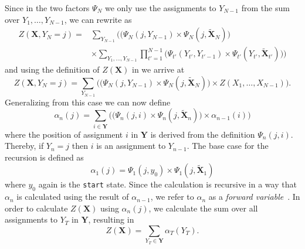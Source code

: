 Since in the two \glspl{factor} $\Psi_N$ we only use the assignments to $Y_{N-1}$ from the sum over $Y_1,\dots,Y_{N-1}$, we can rewrite  as
\begin{equation}
  \label{equ:linear-chain-crf-z-j-2}
  \begin{split}
    Z(\bm{X},Y_N=j) = & \sum_{Y_{N-1}}\bigg(\Big(\Psi_N(j,Y_{N-1})\times\Psi_N(j,\bm{\tilde{X}}_N)\Big) \\
    & \times\sum_{Y_1,\dots,Y_{N-1}}\prod_{t'=1}^{N-1}\Big(\Psi_{t'}(Y_{t'},Y_{t'-1})\times\Psi_{t'}(Y_{t'},\bm{\tilde{X}}_{t'})\Big)\bigg)
  \end{split}
\end{equation}
and using the definition of $Z(\bm{X})$ in  we arrive at
\begin{equation}
  \label{equ:linear-chain-crf-z-j-3}
  Z(\bm{X},Y_N=j) = \sum_{Y_{N-1}}\bigg(\Big(\Psi_N(j,Y_{N-1})\times\Psi_N(j,\bm{\tilde{X}}_N)\Big)\times Z(X_1,\dots,X_{N-1})\bigg).
  \end{equation}
Generalizing from this case we can now define
\begin{equation}
  \label{equ:linear-chain-crf-z-alpha}
  \alpha_n(j) = \sum_{i\in\bm{Y}}\bigg(\Big(\Psi_n(j,i)\times\Psi_n(j,\bm{\tilde{X}}_n)\Big)\times \alpha_{n-1}(i)\bigg)
\end{equation}
where the position of assignment $i$ in $\bm{Y}$ is derived from the definition $\Psi_n(j,i)$.
Thereby, if $Y_n=j$ then $i$ is an assignment to $Y_{n-1}$.
The base case for the recursion is defined as
\begin{equation}
  \label{equ:linear-chain-crf-z-alpha-base}
  \alpha_1(j) = \Psi_1(j,y_0)\times\Psi_1(j,\bm{\tilde{X}}_1)
\end{equation}
where $y_0$ again is the \texttt{start} state. Since the calculation is recursive in a way that $\alpha_n$ is calculated using the result of $\alpha_{n-1}$, we refer to $\alpha_n$ as a \textit{forward variable}~\citep{sutton2010introduction}. In order to calculate $Z(\bm{X})$ using $\alpha_n(j)$, we calculate the sum over all assignments to $Y_T$ in $\bm{Y}$, resulting in
\begin{equation}
  \label{equ:linear-chain-crf-z-alpha-sum}
  Z(\bm{X})=\sum_{Y_T\in\bm{Y}}\alpha_T(Y_T).
\end{equation}

\bigskip

